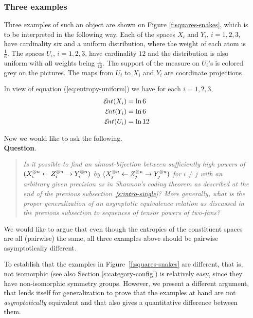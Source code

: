 \subsubsection{Three examples}
Three examples of such an object are shown on Figure
\ref{f:squares-snakes}, which is to be interpreted in the following
way. Each of the spaces $X_{i}$ and $Y_{i}$, $i=1,2,3$, have
cardinality six and a uniform distribution, where the weight of each
atom is $\frac16$.  The spaces $U_{i}$, $i=1,2,3$, have cardinality
$12$ and the distribution is also uniform with all weights being
$\frac{1}{12}$. The support of the measure on $U_{i}$'s is colored
grey on the pictures.  The maps from $U_{i}$ to $X_{i}$ and $Y_{i}$
are coordinate projections.

In view of equation (\ref{eq:entropy-uniform}) we have for each
$i=1,2,3$,
\begin{align*}
  \ent(X_{i})&=\ln 6\\
  \ent(Y_{i})&=\ln 6\\
  \ent(U_{i})&=\ln 12
\end{align*}

Now we would like to ask the following.\\
\textbf{Question}. 
\begin{quote}\em
  Is it possible to find an almost-bijection between sufficiently high
  powers of $(X_{i}^{\otimes n}\stackrel{}{\leftarrow} Z_{i}^{\otimes n}\stackrel{}{\rightarrow} Y_{i}^{\otimes
    n})$ by $(X_{j}^{\otimes n}\stackrel{}{\leftarrow} Z_{j}^{\otimes n}\stackrel{}{\rightarrow} Y_{j}^{\otimes
    n})$ for $i\neq j$ with an arbitrary given precision as in
  Shannon's coding theorem as described at the end of the previous
  subsection~\ref{s:intro-single}?  More generally, what is the proper
  generalization of an asymptotic equivalence relation as discussed in
  the previous subsection to sequences of tensor powers of two-fans?
\end{quote}

  We would like to argue that even though the entropies of the
  constituent spaces are all (pairwise) the same, all three examples
  above should be pairwise asymptotically different.

  To establish that the examples in Figure~\ref{f:squares-snakes} are
  different, that is, not isomorphic (see also Section
  \ref{s:category-config}) is relatively easy, since they have
  non-isomorphic symmetry groups.  However, we present a different
  argument, that lends itself for generalization to prove that the
  examples at hand are not \emph{asymptotically} equivalent and
  that also gives a quantitative difference between them.

